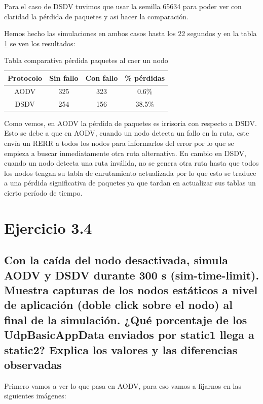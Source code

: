 Para el caso de DSDV tuvimos que usar la semilla 65634 para poder ver con claridad la pérdida de paquetes y asi hacer la comparación.

Hemos hecho las simulaciones en ambos casos hasta los 22 segundos y en la tabla \ref{tabla1} se ven los resultados:

\begin{table}[H]
    \centering
    \begin{tabular}{|c|c|c|c|}
    \hline
    Protocolo & Sin fallo & Con fallo & \% pérdidas \\ \hline
      AODV    &   325     &   323     &     0.6\%   \\ \hline
      DSDV    &   254     &   156     &     38.5\%  \\ \hline
    \end{tabular}
    \caption{Tabla comparativa pérdida paquetes al caer un nodo}
    \label{tabla1}
\end{table}

Como vemos, en AODV la pérdida de paquetes es irrisoria con respecto a DSDV. Esto se debe a que en AODV, cuando un nodo detecta un fallo en la ruta, este envía un RERR a todos los nodos para informarlos del error por lo que se empieza a buscar inmediatamente otra ruta alternativa. En cambio en DSDV, cuando un nodo detecta una ruta inválida, no se genera otra ruta hasta que todos los nodos tengan su tabla de enrutamiento actualizada por lo que esto se traduce a una pérdida significativa de paquetes ya que tardan en actualizar sus tablas un cierto período de tiempo. 

\section{Ejercicio 3.4}

\subsection{Con la caída del nodo desactivada, simula AODV y DSDV durante 300 s (sim-time-limit). Muestra
capturas de los nodos estáticos a nivel de aplicación (doble click sobre el nodo) al final de la simulación. ¿Qué
porcentaje de los UdpBasicAppData enviados por static1 llega a static2? Explica los valores y las diferencias
observadas}

Primero vamos a ver lo que pasa en AODV, para eso vamos a fijarnos en las siguientes imágenes:

